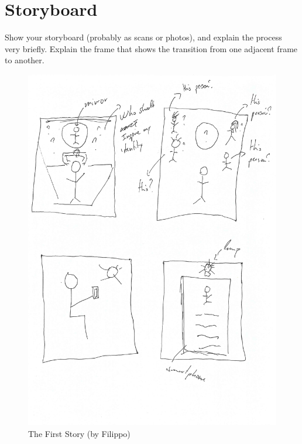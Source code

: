 \documentclass[12pt]{scrartcl}
\begin{document}
\section{Storyboard}
	
	Show your storyboard (probably as scans or photos), and explain the process very briefly. Explain the frame that shows the transition from one adjacent frame to another.
	
	\begin{figure}[H]
        		\centering
       		\includegraphics[width=\textwidth]{sketches/story1.pdf}
       		\caption{The First Story (by Filippo)}
        		\label{story1}
	\end{figure}
	
\end{document}

